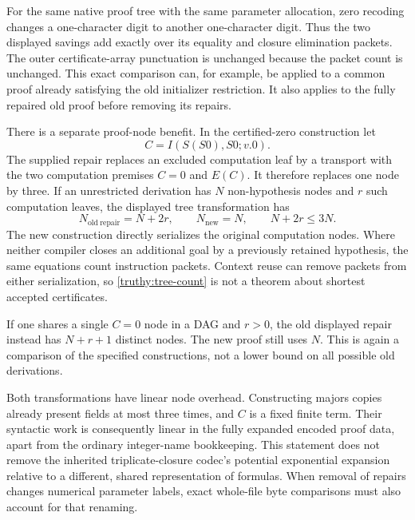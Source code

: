 For the same native proof tree with the same parameter allocation,
zero recoding changes a one-character digit to another one-character
digit.  Thus the two displayed savings add exactly over its equality
and closure elimination packets.  The outer certificate-array
punctuation is unchanged because the packet count is unchanged.
This exact comparison can, for example, be applied to a common proof
already satisfying the old initializer restriction.  It also applies
to the fully repaired old proof before removing its repairs.

There is a separate proof-node benefit.  In the certified-zero
construction let
\[
                      C=I(S(S0),S0;v.0).
\]
The supplied repair replaces an excluded computation leaf by a
transport with the two computation premises \(C=0\) and \(E(C)\).
It therefore replaces one node by three.  If an unrestricted
derivation has \(N\) non-hypothesis nodes and \(r\) such computation
leaves, the displayed tree transformation has
\[
          N_{\mathrm{old\ repair}}=N+2r,
          \qquad N_{\mathrm{new}}=N,\qquad N+2r\leq 3N.
 \tag{Tree counts}\label{truthy:tree-count}
\]
The new construction directly serializes the original computation
nodes.  Where neither compiler closes an additional goal by a
previously retained hypothesis, the same equations count instruction
packets.  Context reuse can remove packets from either serialization,
so \eqref{truthy:tree-count} is not a theorem about shortest accepted
certificates.

If one shares a single \(C=0\) node in a DAG and \(r>0\), the old
displayed repair instead has \(N+r+1\) distinct nodes.  The new proof
still uses \(N\).  This is again a comparison of the specified
constructions, not a lower bound on all possible old derivations.

Both transformations have linear node overhead.  Constructing majors
copies already present fields at most three times, and \(C\) is a
fixed finite term.  Their syntactic work is consequently linear in
the fully expanded encoded proof data, apart from the ordinary
integer-name bookkeeping.  This statement does not remove the
inherited triplicate-closure codec's potential exponential expansion
relative to a different, shared representation of formulas.
When removal of repairs changes numerical parameter labels, exact
whole-file byte comparisons must also account for that renaming.

